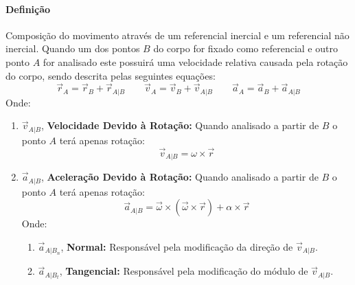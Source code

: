 \documentclass{article}
\begin{document}
            \paragraph{Definição}Composição do movimento através de um referencial inercial e um referencial não inercial. Quando um dos pontos $B$ do corpo for fixado como referencial e outro ponto $A$ for analisado este possuirá uma velocidade relativa causada pela rotação do corpo, sendo descrita pelas seguintes equações:
                \begin{equation}
                    \boxed{
                        \vec{r}_{A} = \vec{r}_{B} + \vec{r}_{A|B}
                    }
                    \qquad
                    \boxed{
                        \vec{v}_{A} = \vec{v}_{B} + \vec{v}_{A|B}
                    }
                    \qquad
                    \boxed{
                        \vec{a}_{A} = \vec{a}_{B} + \vec{a}_{A|B}
                    }
                \end{equation}
            Onde:
                \begin{enumerate}[rightmargin = \leftmargin, noitemsep]
                    \item $\vec{v}_{A|B}$, \textbf{Velocidade Devido à Rotação:} Quando analisado a partir de $B$ o ponto $A$ terá apenas rotação:
                        \begin{equation}
                            \boxed{
                                \vec{v}_{A|B} = \omega\times\vec{r}
                            }
                        \end{equation}

                    \item $\vec{a}_{A|B}$, \textbf{Aceleração Devido à Rotação:} Quando analisado a partir de $B$ o ponto $A$ terá apenas rotação:
                        \begin{equation}
                            \boxed{
                                \vec{a}_{A|B} = \vec{\omega}\times(\vec{\omega}\times\vec{r}) + \alpha\times\vec{r}
                            }
                        \end{equation}
                    Onde:
                        \begin{enumerate}[rightmargin = \leftmargin, noitemsep]
                            \item $\vec{a}_{A|B_{n}}$, \textbf{Normal:} Responsável pela modificação da direção de $\vec{v}_{A|B}$.

                            \item $\vec{a}_{A|B_{t}}$, \textbf{Tangencial:} Responsável pela modificação do módulo de $\vec{v}_{A|B}$.
                        \end{enumerate}
                \end{enumerate}
\end{document}
